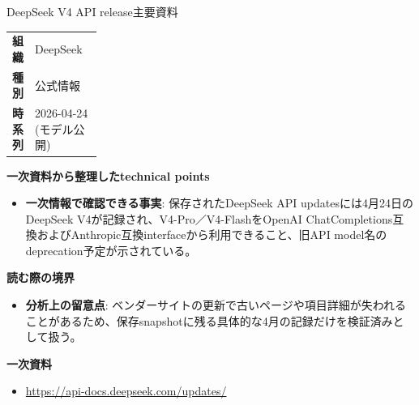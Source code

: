 \begin{technicalnote}{DeepSeek V4 API release}{主要資料}
\begingroup
\begin{tabularx}{\linewidth}{@{}>{\bfseries}p{0.22\linewidth}X@{}}
組織 & DeepSeek \\
種別 & 公式情報 \\
時系列 & 2026-04-24 (モデル公開) \\
\end{tabularx}
\smallskip
{\bfseries 一次資料から整理したtechnical points}
\begin{itemize}[leftmargin=1.5em,itemsep=0.35em]
\item \textbf{一次情報で確認できる事実}: 保存されたDeepSeek API updatesには4月24日のDeepSeek V4が記録され、V4-Pro／V4-FlashをOpenAI ChatCompletions互換およびAnthropic互換interfaceから利用できること、旧API model名のdeprecation予定が示されている。
\end{itemize}
\begin{minipage}{\linewidth}
{\bfseries 読む際の境界}
\begin{itemize}[leftmargin=1.5em,itemsep=0.35em]
\item \textbf{分析上の留意点}: ベンダーサイトの更新で古いページや項目詳細が失われることがあるため、保存snapshotに残る具体的な4月の記録だけを検証済みとして扱う。
\end{itemize}
\begin{samepage}
{\bfseries 一次資料}
\begingroup\sloppy
\begin{itemize}[leftmargin=1.5em,itemsep=0.25em]
\item {\scriptsize\url{https://api-docs.deepseek.com/updates/}}
\end{itemize}
\endgroup
\end{samepage}
\end{minipage}
\endgroup
\end{technicalnote}
\medskip

